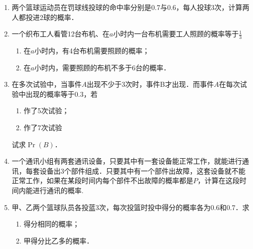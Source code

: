 \begin{enumerate}
\item 两个篮球运动员在罚球线投球的命中率分别是0.7与0.6，每人投球3次，计算两人都投进2球的概率．
\item 一个织布工人看管12台布机、在$a$小时内一台布机需要工人照顾的概率等于$\frac{1}{3}$
\begin{enumerate}[(1)]
\item 在$a$小时内，有4台布机需要照顾的概率；
\item 在$a$小时内，需要照顾的布机不多于6台的概率．
\end{enumerate}

\item 在多次试验中，当事件$A$出现不少于3次时，事件B才出现．而事件$A$在每次试验中出现的概率等于0.3，若
\begin{multicols}{2}
    \begin{enumerate}[(1)]
    \item 作了5次试验；
    \item 作了7次试验
\end{enumerate}
\end{multicols}
试求$\Pr(B)$．

\item 一个通讯小组有两套通讯设备，只要其中有一套设备能正常工作，就能进行通讯，每套设备出3个部件组成．只要其中有一个部件出故障，这套设备就不能正常工作，如果在某段时间内每个部件不出故障的概率都是$P$，计算在这段时间内能进行通讯的概率.
\item 甲、乙两个篮球队员各投蓝3次，每次投篮时投中得分的概率各为0.6和0.7．求
\begin{multicols}{2}
\begin{enumerate}[(1)]
    \item 得分相同的概率；
    \item 甲得分比乙多的概率．
\end{enumerate}    
\end{multicols}

\end{enumerate}

